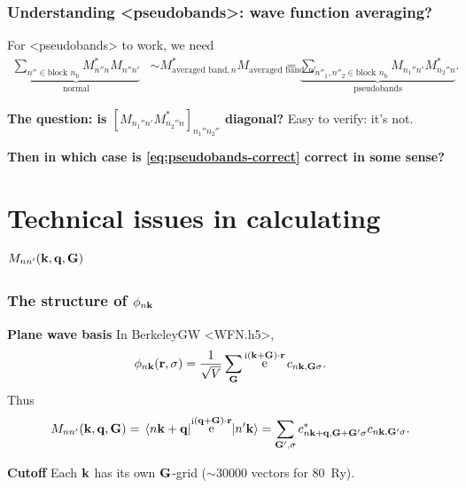 \documentclass[t]{beamer}
\DeclareMathOperator{\ee}{e}
\DeclareMathOperator{\ii}{i}
\newcommand{\shortcode}[1]{\texttt{#1}}
\def\\{}%
\def\texttt#1{<#1>}%
\begin{document}
\begin{frame}
\frametitle{Understanding \shortcode{pseudobands}: wave function averaging?}

For \shortcode{pseudobands} to work, we need 
\begin{equation}
    \begin{aligned}
        \underbrace{
            \sum_{n'' \in \text{block $n_{\text{b}}$}} M_{n'' n}^* M_{n'' n'} 
        }_{\text{normal}}
        &\sim M_{\text{averaged band}, n}^* M_{\text{averaged band}, n'} \\
        &= \underbrace{
            \sum_{n''_1, n''_2 \in \text{block $n_{\text{b}}$}} M_{n_1'' n'} M_{n_2'' n}^*
        }_{\text{pseudobands}}.
    \end{aligned}
    \label{eq:pseudobands-correct}
\end{equation}

\textbf{The question: is $[M_{n_1'' n'} M_{n_2'' n}^*]_{n_1'' n_2''}$ diagonal?}
Easy to verify: it's not.

\vspace{0.5cm}

\textbf{Then in which case is \eqref{eq:pseudobands-correct} correct in some sense?} 

\end{frame}

\section{Technical issues in calculating $M_{nn'}(\vb{k}, \vb{q}, \vb{G})$}

\begin{frame}
\frametitle{The structure of $\phi_{n \vb{k}}$}

\textbf{Plane wave basis} In BerkeleyGW \shortcode{WFN.h5}, 
\begin{equation*}
    \phi_{n \vb{k}}(\vb{r}, \sigma) = \frac{1}{\sqrt{V}} \sum_{\vb{G}} \ee^{\ii (\vb{k} + \vb{G}) \cdot \vb{r}} c_{n \vb{k}, \vb{G} \sigma}.
\end{equation*}    
Thus 
\begin{equation*}
    M_{nn'}(\vb{k}, \vb{q}, \vb{G}) 
    = \mel*{n \vb{k} + \vb{q}}{\ee^{\ii (\vb{q} + \vb{G}) \cdot \vb{r}}}{n' \vb{k}} 
    = \sum_{\vb{G}', \sigma} c^*_{n \vb{k} + \vb{q}, \vb{G} + \vb{G}' \sigma} c_{n \vb{k}, \vb{G}' \sigma}.
\end{equation*}

\textbf{Cutoff} Each $\vb{k}$ has its own $\vb{G}$-grid ($\sim 30000$ vectors for \SI{80}{Ry}).

\end{frame}
\end{document}
